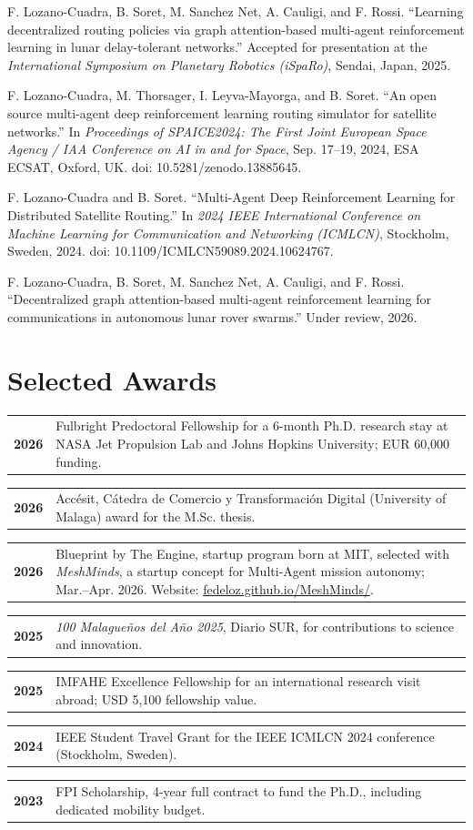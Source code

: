 \documentclass[10.5pt,letterpaper]{article}
\makeatletter
\newcommand{\subsubline}[1]{\vspace{0.12em}{\itshape #1}\par\vspace{0.05em}}
\newlength{\datecolwidth}
\newcommand{\datedentry}[2]{%
  \noindent
  \begin{tabularx}{\textwidth}{@{}>{\RaggedRight\arraybackslash}p{\datecolwidth}@{\hspace{0.65em}}>{\RaggedRight\arraybackslash}X@{}}
    \textbf{#1} & #2
  \end{tabularx}\par\vspace{0.14em}
}
\makeatother
\begin{document}
\subsubline{Selected Conference Publications}
\begin{enumerate}[label={[\arabic*]},start=3,leftmargin=2.1em,itemsep=0.16em,topsep=0.05em]
  \item F. Lozano-Cuadra, B. Soret, M. Sanchez Net, A. Cauligi, and F. Rossi. ``Learning decentralized routing policies via graph attention-based multi-agent reinforcement learning in lunar delay-tolerant networks.'' Accepted for presentation at the \emph{International Symposium on Planetary Robotics (iSpaRo)}, Sendai, Japan, 2025.
  \item F. Lozano-Cuadra, M. Thorsager, I. Leyva-Mayorga, and B. Soret. ``An open source multi-agent deep reinforcement learning routing simulator for satellite networks.'' In \emph{Proceedings of SPAICE2024: The First Joint European Space Agency / IAA Conference on AI in and for Space}, Sep. 17--19, 2024, ESA ECSAT, Oxford, UK. doi: 10.5281/zenodo.13885645.
  \item F. Lozano-Cuadra and B. Soret. ``Multi-Agent Deep Reinforcement Learning for Distributed Satellite Routing.'' In \emph{2024 IEEE International Conference on Machine Learning for Communication and Networking (ICMLCN)}, Stockholm, Sweden, 2024. doi: 10.1109/ICMLCN59089.2024.10624767.
\end{enumerate}

\subsubline{Under Review}
\begin{enumerate}[label={[\arabic*]},start=6,leftmargin=2.1em,itemsep=0.16em,topsep=0.05em]
  \item F. Lozano-Cuadra, B. Soret, M. Sanchez Net, A. Cauligi, and F. Rossi. ``Decentralized graph attention-based multi-agent reinforcement learning for communications in autonomous lunar rover swarms.'' Under review, 2026.
\end{enumerate}

\section{Selected Awards}
\datedentry{2026}{Fulbright Predoctoral Fellowship for a 6-month Ph.D. research stay at NASA Jet Propulsion Lab and Johns Hopkins University; EUR 60{,}000 funding.}
\datedentry{2026}{Acc\'esit, C\'atedra de Comercio y Transformaci\'on Digital (University of Malaga) award for the M.Sc. thesis.}
\datedentry{2026}{Blueprint by The Engine, startup program born at MIT, selected with \emph{MeshMinds}, a startup concept for Multi-Agent mission autonomy; Mar.--Apr. 2026. Website: \href{https://fedeloz.github.io/MeshMinds/}{fedeloz.github.io/MeshMinds/}.}
\datedentry{2025}{\emph{100 Malague\~nos del A\~no 2025}, Diario SUR, for contributions to science and innovation.}
\datedentry{2025}{IMFAHE Excellence Fellowship for an international research visit abroad; USD 5{,}100 fellowship value.}
\datedentry{2024}{IEEE Student Travel Grant for the IEEE ICMLCN 2024 conference (Stockholm, Sweden).}
\datedentry{2023}{FPI Scholarship, 4-year full contract to fund the Ph.D., including dedicated mobility budget.}
\end{document}
